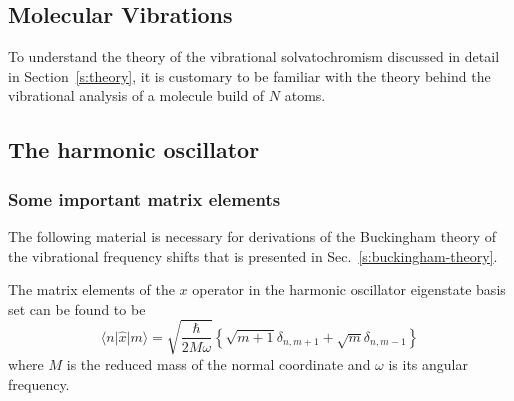 \documentclass[a4paper,titlepage,twoside,fleqn,12pt]{book}
\begin{document}
\begin{appendices}

\chapter{Molecular Vibrations\label{a:vibrational-analysis}}

To understand the theory of the vibrational solvatochromism 
discussed in detail in Section~\ref{s:theory}, it is customary
to be familiar with the theory behind the vibrational analysis
of a molecule build of $N$ atoms.

\section{The harmonic oscillator\label{a:harmonic-oscillator}}

\subsection{Some important matrix elements\label{a:matrix-elements}}

The following material is necessary for derivations of the Buckingham theory
of the vibrational frequency shifts that is presented in Sec.~\ref{s:buckingham-theory}. 

The matrix elements of the $x$ operator in the harmonic oscillator eigenstate basis set
can be found to be
%
\begin{equation}
\label{ea:mxn}
\langle n \vert \hat{x} \vert m \rangle = 
\sqrt{
\frac{\hbar}{2M\omega}
}
\left\{ 
   \sqrt{m+1} \delta_{n,m+1} + \sqrt{m} \delta_{n,m-1}
\right\}
\end{equation}
%
\noindent where $M$ is the reduced mass of the normal coordinate and $\omega$ is its 
angular frequency.


\end{appendices}
\end{document}
